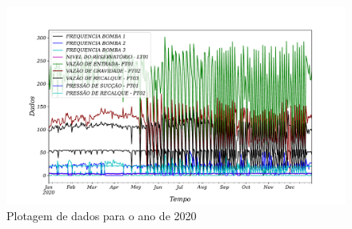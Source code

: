 \begin{figure}[H]
	\centering
	\caption{Plotagem de dados para o ano de 2020}\label{fig:2020-a-frente}
	\includegraphics[width=0.9\linewidth]{"Introducao/Figuras/2020 a frente"}

	
	
\end{figure}





